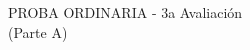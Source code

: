 %
\begin{center}
    \large{
    PROBA ORDINARIA - 3a Avaliación}\\
    \vspace*{0.35cm}
    \large (Parte A)
\end{center}
\vspace*{0.15cm}
